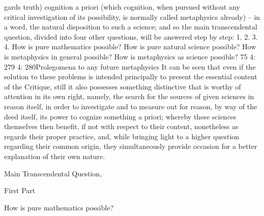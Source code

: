 gards truth) cognition a priori (which cognition, when pursued without
any critical investigation of its possibility, is normally called metaphysics
already) – in a word, the natural disposition to such a science; and so the
main transcendental question, divided into four other questions, will be
answered step by step:
1.
2.
3.
4.
How is pure mathematics possible?
How is pure natural science possible?
How is metaphysics in general possible?
How is metaphysics as science possible?
75
4: 279
4: 280Prolegomena to any future metaphysics
It can be seen that even if the solution to these problems is intended
principally to present the essential content of the Critique, still it also
possesses something distinctive that is worthy of attention in its own
right, namely, the search for the sources of given sciences in reason itself,
in order to investigate and to measure out for reason, by way of the deed
itself, its power to cognize something a priori; whereby these sciences
themselves then beneﬁt, if not with respect to their content, nonetheless
as regards their proper practice, and, while bringing light to a higher
question regarding their common origin, they simultaneously provide
occasion for a better explanation of their own nature.

Main Transcendental Question,

First Part

How is pure mathematics possible?

